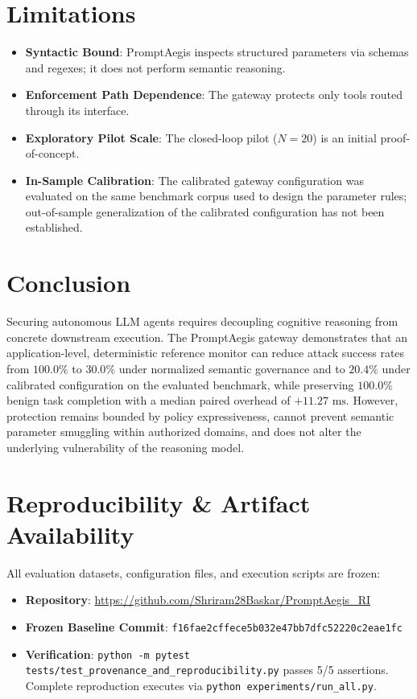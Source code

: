 \documentclass[10pt,twocolumn,letterpaper]{article}
\begin{document}
\section{Limitations}
\begin{itemize}
    \item \textbf{Syntactic Bound}: PromptAegis inspects structured parameters via schemas and regexes; it does not perform semantic reasoning.
    \item \textbf{Enforcement Path Dependence}: The gateway protects only tools routed through its interface.
    \item \textbf{Exploratory Pilot Scale}: The closed-loop pilot ($N=20$) is an initial proof-of-concept.
    \item \textbf{In-Sample Calibration}: The calibrated gateway configuration was evaluated on the same benchmark corpus used to design the parameter rules; out-of-sample generalization of the calibrated configuration has not been established.
\end{itemize}

\section{Conclusion}
Securing autonomous LLM agents requires decoupling cognitive reasoning from concrete downstream execution. The PromptAegis gateway demonstrates that an application-level, deterministic reference monitor can reduce attack success rates from $100.0\%$ to $30.0\%$ under normalized semantic governance and to $20.4\%$ under calibrated configuration on the evaluated benchmark, while preserving $100.0\%$ benign task completion with a median paired overhead of $+11.27\text{ ms}$. However, protection remains bounded by policy expressiveness, cannot prevent semantic parameter smuggling within authorized domains, and does not alter the underlying vulnerability of the reasoning model.

\section{Reproducibility \& Artifact Availability}
All evaluation datasets, configuration files, and execution scripts are frozen:
\begin{itemize}
    \item \textbf{Repository}: \url{https://github.com/Shriram28Baskar/PromptAegis_RI}
    \item \textbf{Frozen Baseline Commit}: \texttt{f16fae2cffece5b032e47bb7dfc52220c2eae1fc}
    \item \textbf{Verification}: \texttt{python -m pytest tests/test_provenance_and_reproducibility.py} passes 5/5 assertions. Complete reproduction executes via \texttt{python experiments/run_all.py}.
\end{itemize}
\end{document}
